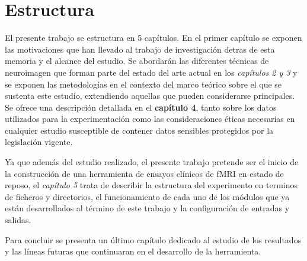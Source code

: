 
\section{Estructura}

El presente trabajo se estructura en 5 capítulos. En el primer capítulo se exponen las motivaciones que han llevado al trabajo de investigación detras de esta memoria y el alcance del estudio. Se abordarán las diferentes técnicas de neuroimagen que forman parte del estado del arte actual en los \textit{capítulos 2 y 3} y se exponen las metodologías en el contexto del marco teórico sobre el que se sustenta este estudio, extendiendo aquellas que pueden considerarse principales. Se ofrece una descripción detallada en el \textbf{capítulo 4}, tanto sobre los datos utilizados para la experimentación como las consideraciones éticas necesarias en cualquier estudio susceptible de contener datos sensibles protegidos por la legislación vigente. 

Ya que además del estudio realizado, el presente trabajo pretende ser el inicio de la construcción de una herramienta de ensayos clínicos de fMRI en estado de reposo, el \textit{capítulo 5} trata de describir la estructura del experimento en terminos de ficheros y directorios, el funcionamiento de cada uno de los módulos que ya están desarrollados al término de este trabajo y la configuración de entradas y salidas.

Para concluir se presenta un último capítulo dedicado al estudio de los resultados y las líneas futuras que continuaran en el desarrollo de la herramienta.

%
%
